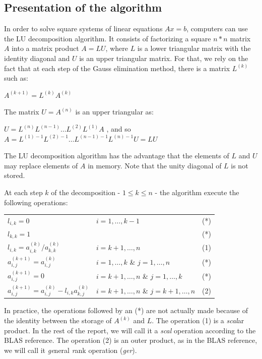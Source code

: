 \subsection*{Presentation of the algorithm}
In order to solve square systems of linear equations $Ax=b$, computers can use the LU decomposition algorithm. It consists of factorizing a square $n*n$ matrix $A$  into a matrix product $A=LU$, where $L$ is a lower triangular matrix with the identity diagonal and $U$ is an upper triangular matrix. For that, we rely on the fact that at each step of the Gauss elimination method, there is a matrix $L^{(k)}$ such as:
\begin{center}
$A^{(k+1)} = L^{(k)}A^{(k)}$
\end{center}
The matrix $U=A^{(n)}$ is an upper triangular as:
\begin{center}
$U=L^{(n)}L^{(n-1)}\dots L^{(2)}L^{(1)}A$ , and so\\
$A=L^{(1)-1}L^{(2)-1}\dots L^{(n-1)-1}L^{(n)-1}U=LU$
\end{center}
The LU decomposition algorithm has the advantage that the elements of $L$ and $U$ may replace elements of $A$ in memory. Note that the unity diagonal of $L$ is not stored.

At each step $k$ of the decomposition - $1\leq k\leq n$ - the algorithm execute the following operations:
\begin{center}
\begin{tabular}{lll}
$l_{i,k} = 0$ & $i = 1,\dots , k-1$ & (*)\\
$l_{k,k} = 1$ & & (*)\\
$l_{i,k} = a_{i,k}^{(k)}/a_{k,k}^{(k)}$ & $i = k+1,\dots , n$ & (1)\\
$a_{i,j}^{(k+1)}=a_{i,j}^{(k)}$ & $i=1,\dots,k$ \& $j=1,\dots,n$ & (*)\\
$a_{i,j}^{(k+1)}=0$ & $i=k+1,\dots,n$ \& $j=1,\dots,k$ & (*)\\
$a_{i,j}^{(k+1)}=a_{i,j}^{(k)}-l_{i,k}a_{k,j}^{(k)}$ & $i=k+1,\dots,n$ \& $j=k+1,\dots,n$ & (2)\\
\end{tabular}
\end{center}
In practice, the operations followed by an (*) are not actually made because of the identity between the storage of $A^{(k)}$ and $L$. The operation (1) is a \emph{scal}ar product. In the rest of the report, we will call it a \emph{scal} operation according to the BLAS reference. The operation (2) is an outer product, as in the BLAS reference, we will call it \emph{ge}neral \emph{r}ank  operation (\emph{ger}).

